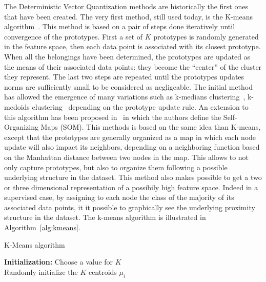     The Deterministic Vector Quantization methods are historically the first ones that have been created. The very first method, still used today, is the K-means algorithm~\cite{macqueen1967some}. This method is based on a pair of steps done iteratively until convergence of the prototypes. First a set of $K$ prototypes is randomly generated in the feature space, then each data point is associated with its closest prototype. When all the belongings have been determined, the prototypes are updated as the means of their associated data points: they become the ``center'' of the cluster they represent. The last two steps are repeated until the prototypes updates norms are sufficiently small to be considered as negligeable. The initial method has allowed the emergence of many variations such as k-medians clustering~\cite{jain1988algorithms}, k-medoids clustering~\cite{kaufman1987clustering} depending on the prototype update rule. An extension to this algorithm has been proposed in~\cite{kohonen1998self} in which the authors define the Self-Organizing Maps (SOM). This methods is based on the same idea than K-means, except that the prototypes are generally organized as a map in which each node update will also impact its neighbors, depending on a neighboring function based on the Manhattan distance between two nodes in the map. This allows to not only capture prototypes, but also to organize them following a possible underlying structure in the dataset. This method also makes possible to get a two or three dimensional representation of a possibily high feature space. Indeed in a supervised case, by assigning to each node the class of the majority of its associated data points, it it possible to graphically see the underlying proximity structure in the dataset. The k-means algorithm is illustrated in Algorithm~\ref{alg:kmeans}.

    \begin{algorithm}
        \caption{K-Means algorithm}
\label{alg:kmeans}
        \textbf{Initialization:} Choose a value for $K$\\
        Randomly initialize the $K$ centroids $\mu_i$\\
    \end{algorithm}

